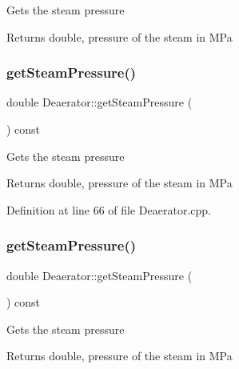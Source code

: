 Gets the steam pressure \begin{DoxyReturn}{Returns}
double, pressure of the steam in M\+Pa 
\end{DoxyReturn}
\mbox{\label{class_deaerator_aebe779c63cace193d040f497e3b70728}} 
\subsubsection{\texorpdfstring{get\+Steam\+Pressure()}{getSteamPressure()}\hspace{0.1cm}{\footnotesize\ttfamily [2/3]}}
{\footnotesize\ttfamily double Deaerator\+::get\+Steam\+Pressure (\begin{DoxyParamCaption}{ }\end{DoxyParamCaption}) const}

Gets the steam pressure \begin{DoxyReturn}{Returns}
double, pressure of the steam in M\+Pa 
\end{DoxyReturn}


Definition at line 66 of file Deaerator.\+cpp.

\mbox{\label{class_deaerator_aebe779c63cace193d040f497e3b70728}} 
\subsubsection{\texorpdfstring{get\+Steam\+Pressure()}{getSteamPressure()}\hspace{0.1cm}{\footnotesize\ttfamily [3/3]}}
{\footnotesize\ttfamily double Deaerator\+::get\+Steam\+Pressure (\begin{DoxyParamCaption}{ }\end{DoxyParamCaption}) const}

Gets the steam pressure \begin{DoxyReturn}{Returns}
double, pressure of the steam in M\+Pa 
\end{DoxyReturn}
\mbox{\label{class_deaerator_a18abbdc5ec78f71e1d2495b0c64c77ec}} 
